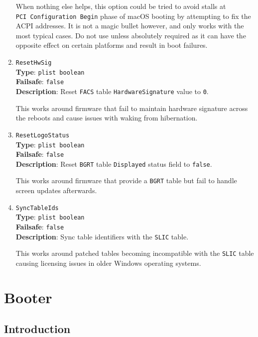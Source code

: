 \documentclass[]{article}
\makeatletter
\renewcommand{\label}[1]{%
\zref@wrapper@immediate{\oldlabel{#1}}}  %
\makeatother
\begin{document}
\begin{enumerate}
  When nothing else helps, this option could be tried to avoid stalls at
  \texttt{PCI\ Configuration\ Begin} phase of macOS booting by attempting to fix
  the ACPI addresses. It is not a magic bullet however, and only works with the
  most typical cases. Do not use unless absolutely required as it can have the
  opposite effect on certain platforms and result in boot failures.

\item
  \texttt{ResetHwSig}\\
  \textbf{Type}: \texttt{plist\ boolean}\\
  \textbf{Failsafe}: \texttt{false}\\
  \textbf{Description}: Reset \texttt{FACS} table \texttt{HardwareSignature}
  value to \texttt{0}.

  This works around firmware that fail to maintain hardware signature across
  the reboots and cause issues with waking from hibernation.

\item
  \texttt{ResetLogoStatus}\\
  \textbf{Type}: \texttt{plist\ boolean}\\
  \textbf{Failsafe}: \texttt{false}\\
  \textbf{Description}: Reset \texttt{BGRT} table \texttt{Displayed}
  status field to \texttt{false}.

  This works around firmware that provide a \texttt{BGRT} table but
  fail to handle screen updates afterwards.

\item
  \texttt{SyncTableIds}\\
  \textbf{Type}: \texttt{plist\ boolean}\\
  \textbf{Failsafe}: \texttt{false}\\
  \textbf{Description}: Sync table identifiers with the \texttt{SLIC} table.

  This works around patched tables becoming incompatible with the \texttt{SLIC}
  table causing licensing issues in older Windows operating systems.

\end{enumerate}


\section{Booter}\label{booter}

\subsection{Introduction}\label{booterintro}
\end{document}
